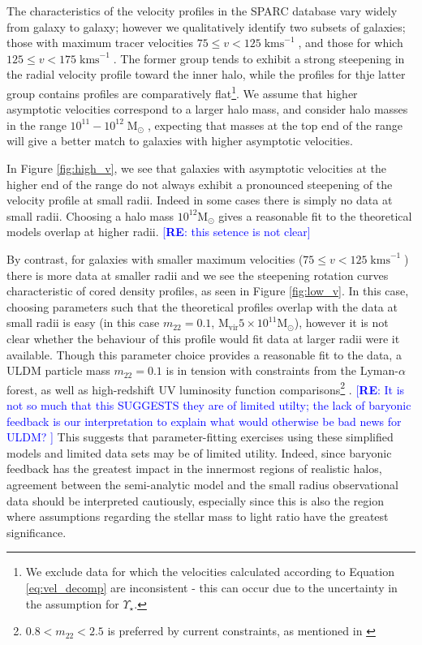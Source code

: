 \documentclass{pasa}%
\newcommand{\re}[1]{\textcolor{blue}{[{\bf RE}: #1]}}
\begin{document}
The characteristics of the velocity profiles in the SPARC database vary widely from galaxy to galaxy; however we qualitatively identify two subsets of galaxies; those with maximum tracer velocities $75 \leq v < 125\operatorname{kms}^{-1}$, and those for which $125 \leq v < 175\operatorname{kms}^{-1}$. The former group tends to exhibit a strong steepening in the radial velocity profile toward the inner halo, while the  profiles for thje latter  group contains profiles  are comparatively flat\footnote{We exclude data for which the velocities calculated according to Equation \ref{eq:vel_decomp} are inconsistent - this can occur due to the uncertainty in the assumption for $\Upsilon_\star$.}. We assume that higher asymptotic velocities correspond to a larger halo mass, and consider halo masses in the range $10^{11} - 10^{12} \operatorname{M}_{\odot}$, expecting that masses at the top end of the range will give a better match to galaxies with higher asymptotic velocities. 


In Figure \ref{fig:high_v}, we see that galaxies with asymptotic velocities at the higher end of the range do not always exhibit a  pronounced steepening of the velocity profile at small radii. Indeed in some cases there is simply no data at small radii. Choosing a halo mass $10^{12} \mathrm{M}_{\odot}$ gives a reasonable fit to the theoretical models overlap at higher radii. \re{this setence is not clear} 

By contrast, for galaxies with smaller maximum velocities ($75 \leq v < 125\operatorname{kms}^{-1}$) there is more data at smaller radii and we see the steepening rotation curves characteristic of cored density profiles, as seen in Figure \ref{fig:low_v}. In this case, choosing parameters such that the theoretical profiles overlap with the data at small radii is easy (in this case $m_{22} = 0.1$, $\mathrm{M}_{\mathrm{vir}}5\times10^{11} \mathrm{M}_{\odot}$), however it is not clear whether the behaviour of this profile would fit data at larger radii were it available. Though this parameter choice provides a reasonable fit to the data, a ULDM particle mass $m_{22} = 0.1$ is in tension with constraints from the Lyman-$\alpha$ forest, as well as high-redshift UV luminosity function comparisons\footnote{$ 0.8 < m_{22} < 2.5$ is preferred by current constraints, as mentioned in \cite{Robles:2018fur}} \cite{Amendola:2005ad, Bozek:2014uqa, Armengaud:2017nkf, Ni:2019qfa, Nebrin:2018vqt}. \re{It is not so much that this SUGGESTS they are of limited utilty; the lack of baryonic feedback is our interpretation to explain what would otherwise be bad news for ULDM? } This suggests that parameter-fitting exercises using these simplified models and limited data sets may be of limited utility. Indeed, since baryonic feedback has the greatest impact in the innermost regions of realistic halos, agreement between the semi-analytic model and the small radius observational data should be interpreted cautiously, especially since this is also the region where assumptions regarding the stellar mass to light ratio have the greatest significance.  
\end{document}
